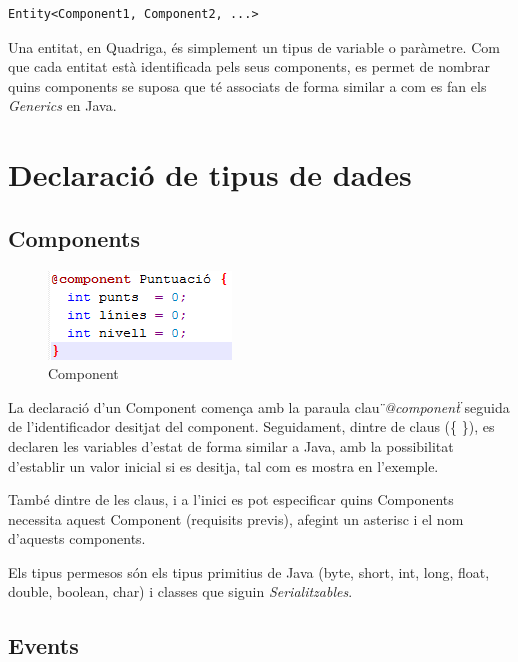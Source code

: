 \begin{verbatim}
Entity<Component1, Component2, ...>
\end{verbatim}

Una entitat, en Quadriga, és simplement un tipus de variable o paràmetre. Com que cada entitat està identificada pels seus components, es permet de nombrar quins components se suposa que té associats de forma similar a com es fan els {\em Generics} en Java.

\section{Declaració de tipus de dades}

\subsection{Components}


\begin{figure}[h!]
  \includegraphics{./img/ExempleComponent.png}
  \caption{Component}
\end{figure}

La declaració d'un Component comença amb la paraula clau {\em \"{}@component\"{}} seguida de l'identificador desitjat del component. Seguidament, dintre de claus (\{ \}), es declaren les variables d'estat de forma similar a Java, amb la possibilitat d'establir un valor inicial si es desitja, tal com es mostra en l'exemple.

També dintre de les claus, i a l'inici es pot especificar quins Components necessita aquest Component (requisits previs), afegint un asterisc {\bf *} i el nom d'aquests components.

Els tipus permesos són els tipus primitius de Java (byte, short, int, long, float, double, boolean, char) i classes que siguin {\em Serialitzables}.

\subsection{Events}

